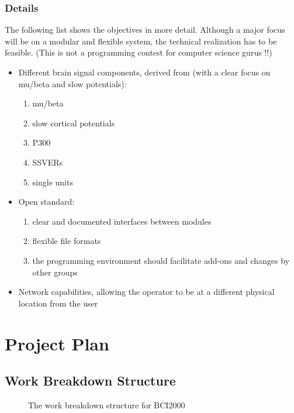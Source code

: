 \documentclass[letterpaper,oneside,12pt]{book}
\begin{document}
\subsection{Details}

The following list shows the objectives in more detail. Although a major focus 
will be on a modular and flexible system, the technical realization has to be 
feasible. (This is not a programming contest for computer science gurus !!) 

\begin{itemize}
 \item{Different brain signal components, derived from (with a clear focus on mu/beta and slow potentials):}
    \begin{enumerate}
      \item{mu/beta}
      \item{slow cortical potentials}
      \item{P300}
      \item{SSVERs}
      \item{single units}
    \end{enumerate}
 \item{Open standard:}
    \begin{enumerate}
      \item{clear and documented interfaces between modules}
      \item{flexible file formats}
      \item{the programming environment should facilitate add-ons and changes by other groups}
    \end{enumerate}
 \item{Network capabilities, allowing the operator to be at a different physical location from the user}
\end{itemize}


\chapter{Project Plan}

\section{Work Breakdown Structure}

\begin{figure}[ht]
 \centerline{}
 \caption{The work breakdown structure for BCI2000}
\end{figure}
\end{document}
